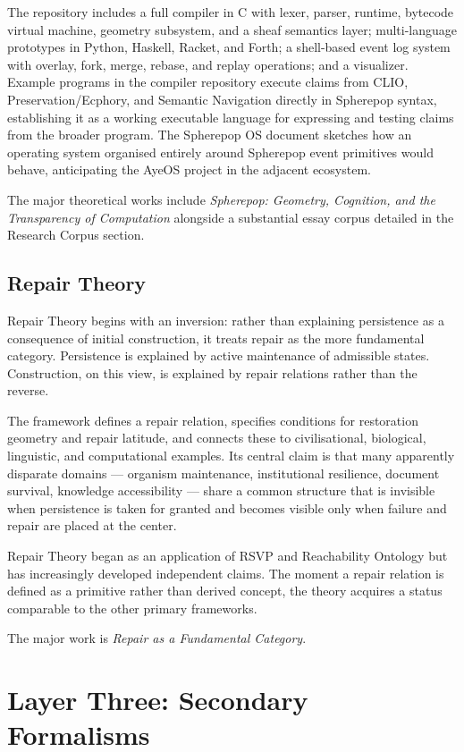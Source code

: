 \documentclass[12pt, twoside]{article}
\begin{document}
The repository includes a full compiler in C with lexer, parser, runtime,
bytecode virtual machine, geometry subsystem, and a sheaf semantics layer;
multi-language prototypes in Python, Haskell, Racket, and Forth; a
shell-based event log system with overlay, fork, merge, rebase, and replay
operations; and a visualizer. Example programs in the compiler repository
execute claims from CLIO, Preservation/Ecphory, and Semantic Navigation
directly in Spherepop syntax, establishing it as a working executable
language for expressing and testing claims from the broader program. The
Spherepop OS document sketches how an operating system organised entirely
around Spherepop event primitives would behave, anticipating the AyeOS
project in the adjacent ecosystem.

The major theoretical works include \emph{Spherepop: Geometry, Cognition,
and the Transparency of Computation} alongside a substantial essay corpus
detailed in the Research Corpus section.

\subsection{Repair Theory}

Repair Theory begins with an inversion: rather than explaining persistence as
a consequence of initial construction, it treats repair as the more
fundamental category. Persistence is explained by active maintenance of
admissible states. Construction, on this view, is explained by repair
relations rather than the reverse.

The framework defines a repair relation, specifies conditions for restoration
geometry and repair latitude, and connects these to civilisational,
biological, linguistic, and computational examples. Its central claim is that
many apparently disparate domains — organism maintenance, institutional
resilience, document survival, knowledge accessibility — share a common
structure that is invisible when persistence is taken for granted and becomes
visible only when failure and repair are placed at the center.

Repair Theory began as an application of RSVP and Reachability Ontology but
has increasingly developed independent claims. The moment a repair relation is
defined as a primitive rather than derived concept, the theory acquires a
status comparable to the other primary frameworks.

The major work is \emph{Repair as a Fundamental Category}.

\section{Layer Three: Secondary Formalisms}
\end{document}
